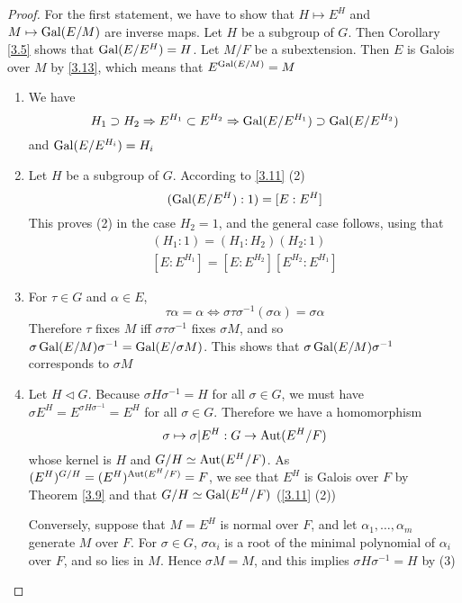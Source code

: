 \documentclass[11pt]{article}
\begin{document}
\begin{proof}
For the first statement, we have to show that \(H\mapsto E^H\) and \(M\mapsto\operatorname{Gal}(E/M)\) are inverse maps.
Let \(H\) be a subgroup of \(G\). Then Corollary \ref{3.5} shows that \(\operatorname{Gal}(E/E^H)=H\).
Let \(M/F\) be a subextension. Then \(E\) is Galois over \(M\) by \ref{3.13}, which means
that \(E^{\operatorname{Gal}(E/M)}=M\)
\begin{enumerate}
\item We have
\begin{equation*}
H_1\supset H_2\Rightarrow E^{H_1}\subset E^{H_2}\Rightarrow\operatorname{Gal}(E/E^{H_1})\supset\operatorname{Gal}(E/E^{H_2})
\end{equation*}
and \(\operatorname{Gal}(E/E^{H_i})=H_i\)
\item Let \(H\) be a subgroup of \(G\). According to \ref{3.11} (2)
\begin{equation*}
(\operatorname{Gal}(E/E^H):1)=[E:E^H]
\end{equation*}
This proves (2) in the case \(H_2=1\), and the general case follows, using that
\begin{gather*}
(H_1:1)=(H_1:H_2)(H_2:1)\\
[E:E^{H_1}]=[E:E^{H_2}][E^{H_2}:E^{H_1}]
\end{gather*}
\item For \(\tau\in G\) and \(\alpha\in E\),
\begin{equation*}
\tau\alpha=\alpha\Leftrightarrow\sigma\tau\sigma^{-1}(\sigma\alpha)=\sigma\alpha
\end{equation*}
Therefore \(\tau\) fixes \(M\) iff \(\sigma\tau\sigma^{-1}\) fixes \(\sigma M\), and
so \(\sigma\operatorname{Gal}(E/M)\sigma^{-1}=\operatorname{Gal}(E/\sigma M)\). This shows that \(\sigma\operatorname{Gal}(E/M)\sigma^{-1}\) corresponds
to \(\sigma M\)
\item Let \(H\lhd G\). Because \(\sigma H\sigma^{-1}=H\) for all \(\sigma\in  G\), we must have \(\sigma E^H=E^{\sigma H\sigma^{-1}}=E^H\) for
all \(\sigma\in G\). Therefore we have a homomorphism
\begin{equation*}
\sigma\mapsto\sigma|E^H:G\to\operatorname{\text{Aut}}(E^H/F)
\end{equation*}
whose kernel is \(H\) and \(G/H\simeq\operatorname{\text{Aut}}(E^H/F)\). As \((E^H)^{G/H}=(E^H)^{\operatorname{\text{Aut}}(E^H/F)}=F\), we see
that \(E^H\) is Galois over \(F\) by
Theorem \ref{3.9} and that \(G/H\simeq\operatorname{Gal}(E^H/F)\) (\ref{3.11} (2))

Conversely, suppose that \(M=E^H\) is normal over \(F\), and let \(\alpha_1,\dots,\alpha_m\) generate \(M\)
over \(F\). For \(\sigma\in G\), \(\sigma\alpha_i\) is a root of the minimal polynomial of \(\alpha_i\) over \(F\),
and so lies in \(M\). Hence \(\sigma M=M\), and this implies \(\sigma H\sigma^{-1}=H\) by (3)
\end{enumerate}
\end{proof}
\end{document}
